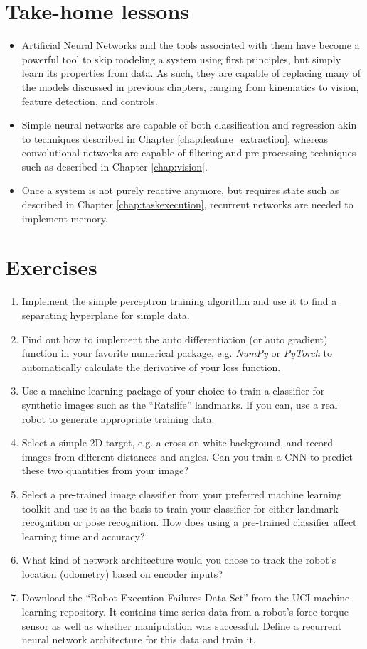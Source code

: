 \section*{Take-home lessons}
\begin{itemize}
\item Artificial Neural Networks and the tools associated with them have become a powerful tool to skip modeling a system using first principles, but simply learn its properties from data. As such, they are capable of replacing many of the models discussed in previous chapters, ranging from kinematics to vision, feature detection, and controls.
\item Simple neural networks are capable of both classification and regression akin to techniques described in Chapter \ref{chap:feature_extraction}, whereas convolutional networks are capable of filtering and pre-processing techniques such as described in Chapter \ref{chap:vision}.
\item Once a system is not purely reactive anymore, but requires state such as described in Chapter \ref{chap:taskexecution}, recurrent networks are needed to implement memory. 
\end{itemize}
\section*{Exercises}\small
\begin{enumerate}
\item Implement the simple perceptron training algorithm and use it to find a separating hyperplane for simple data.
\item Find out how to implement the auto differentiation (or auto gradient) function in your favorite numerical package, e.g. \textsl{NumPy} or \textsl{PyTorch} to automatically calculate the derivative of your loss function.
\item Use a machine learning package of your choice to train a classifier for synthetic images such as the ``Ratslife'' landmarks. If you can, use a real robot to generate appropriate training data.
\item Select a simple 2D target, e.g. a cross on white background, and record images from different distances and angles. Can you train a CNN to predict these two quantities from your image?
\item Select a pre-trained image classifier from your preferred machine learning toolkit and use it as the basis to train your classifier for either landmark recognition or pose recognition. How does using a pre-trained classifier affect learning time and accuracy?
\item What kind of network architecture would you chose to track the robot's location (odometry) based on encoder inputs?
\item Download the ``Robot Execution Failures Data Set'' from the UCI machine learning repository. It contains time-series data from a robot's force-torque sensor as well as whether manipulation was successful. Define a recurrent neural network architecture for this data and train it.
\end{enumerate}\normalsize


